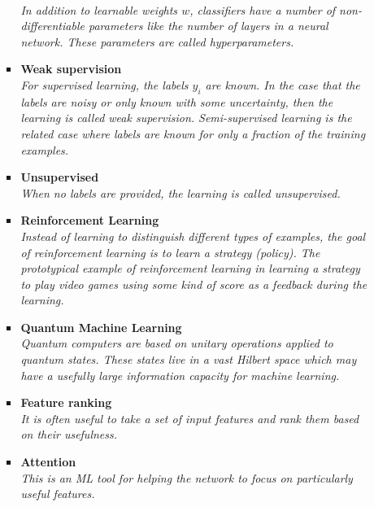 \documentclass[12pt,letterpaper]{article}
\begin{document}
\begin{itemize}
\begin{itemize}
\begin{itemize}
				\\\textit{In addition to learnable weights $w$, classifiers have a number of non-differentiable parameters like the number of layers in a neural network.  These parameters are called hyperparameters.}
				\item \textbf{Weak supervision}~\cite{Dery:2017fap,Metodiev:2017vrx,Komiske:2018oaa,Collins:2018epr,Collins:2019jip,Borisyak:2019vbz,Cohen:2017exh,Komiske:2018vkc,Metodiev:2018ftz,collaboration2020dijet,Amram:2020ykb,Brewer:2020och,Dahbi:2020zjw,Lee:2019ssx}
				\\\textit{For supervised learning, the labels $y_i$ are known.  In the case that the labels are noisy or only known with some uncertainty, then the learning is called weak supervision.  Semi-supervised learning is the related case where labels are known for only a fraction of the training examples.}
				\item \textbf{Unsupervised}~\cite{Mackey:2015hwa,Komiske:2019fks,1797846,Dillon:2019cqt,Cai:2020vzx,Howard:2021pos}
				\\\textit{When no labels are provided, the learning is called unsupervised.}
				\item \textbf{Reinforcement Learning}~\cite{Carrazza:2019efs,Brehmer:2020brs,John:2020sak,Harvey:2021oue}
				\\\textit{Instead of learning to distinguish different types of examples, the goal of reinforcement learning is to learn a strategy (policy).  The prototypical example of reinforcement learning in learning a strategy to play video games using some kind of score as a feedback during the learning.}
				\item \textbf{Quantum Machine Learning}~\cite{Mott:2017xdb,Zlokapa:2019lvv,Blance:2020nhl,Terashi:2020wfi,Chen:2020zkj,Wu:2020cye,Guan:2020bdl,Chen:2021ouz,Blance:2021gcs,Heredge:2021vww,Wu:2021xsj,Belis:2021zqi}
				\\\textit{Quantum computers are based on unitary operations applied to quantum states.  These states live in a vast Hilbert space which may have a usefully large information capacity for machine learning.}
				\item \textbf{Feature ranking}~\cite{Faucett:2020vbu,Grojean:2020ech}
				\\\textit{It is often useful to take a set of input features and rank them based on their usefulness.}
				\item \textbf{Attention}~\cite{goto2021development}
				\\\textit{This is an ML tool for helping the network to focus on particularly useful features.}

\end{itemize}
\end{itemize}
\end{itemize}
\end{document}
